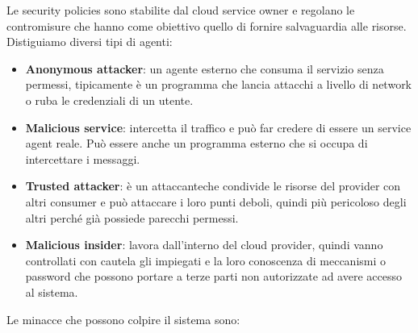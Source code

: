 Le security policies sono stabilite dal cloud service owner e regolano le contromisure che hanno come obiettivo quello di fornire salvaguardia alle risorse. Distiguiamo diversi tipi di agenti:
\begin{itemize}
    \item \textbf{Anonymous attacker}: un agente esterno che consuma il servizio senza permessi, tipicamente è un programma che lancia attacchi a livello di network o ruba le credenziali di un utente.
    \item \textbf{Malicious service}: intercetta il traffico e può far credere di essere un service agent reale. Può essere anche un programma esterno che si occupa di intercettare i messaggi.
    \item \textbf{Trusted attacker}: è un attaccanteche condivide le risorse del provider con altri consumer e può attaccare i loro punti deboli, quindi più pericoloso degli altri perché già possiede parecchi permessi.
    \item \textbf{Malicious insider}: lavora dall'interno del cloud provider, quindi vanno controllati con cautela gli impiegati e la loro conoscenza di meccanismi o password che possono portare a terze parti non autorizzate ad avere accesso al sistema.
\end{itemize}
Le minacce che possono colpire il sistema sono:
